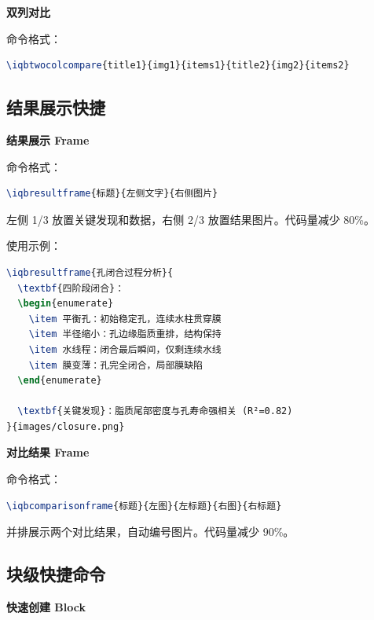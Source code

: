 \textbf{双列对比}

命令格式：

\begin{lstlisting}[style=blockstyle,language=TeX]
\iqbtwocolcompare{title1}{img1}{items1}{title2}{img2}{items2}
\end{lstlisting}

\subsection{结果展示快捷}

\textbf{结果展示 Frame}

命令格式：

\begin{lstlisting}[style=blockstyle,language=TeX]
\iqbresultframe{标题}{左侧文字}{右侧图片}
\end{lstlisting}

左侧 1/3 放置关键发现和数据，右侧 2/3 放置结果图片。代码量减少 80\%。

使用示例：

\begin{lstlisting}[style=blockstyle,language=TeX]
\iqbresultframe{孔闭合过程分析}{
  \textbf{四阶段闭合}：
  \begin{enumerate}
    \item 平衡孔：初始稳定孔，连续水柱贯穿膜
    \item 半径缩小：孔边缘脂质重排，结构保持
    \item 水线程：闭合最后瞬间，仅剩连续水线
    \item 膜变薄：孔完全闭合，局部膜缺陷
  \end{enumerate}

  \textbf{关键发现}：脂质尾部密度与孔寿命强相关 (R²=0.82)
}{images/closure.png}
\end{lstlisting}

\textbf{对比结果 Frame}

命令格式：

\begin{lstlisting}[style=blockstyle,language=TeX]
\iqbcomparisonframe{标题}{左图}{左标题}{右图}{右标题}
\end{lstlisting}

并排展示两个对比结果，自动编号图片。代码量减少 90\%。

\subsection{块级快捷命令}

\textbf{快速创建 Block}

